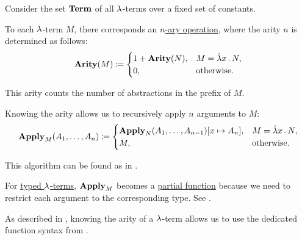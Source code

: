 \begin{algorithm}\label{alg:untyped_lambda_term_to_function}
  Consider the set \hyperref[def:lambda_term/term]{\( \op*{Term} \)} of all \( {\mathrm \lambda} \)-terms over a fixed set of constants.

  To each \( {\mathrm \lambda} \)-term \( M \), there corresponds an \hyperref[def:operation_on_set]{\( n \)-ary operation}, where the arity \( n \) is determined as follows:
  \begin{equation}\label{eq:alg:untyped_lambda_term_to_function/arity}
    \op*{Arity}(M) \coloneqq \begin{cases}
      1 + \op*{Arity}(N), &M = \qabs x N, \\
      0,                  &\T{otherwise.}
    \end{cases}
  \end{equation}

  This arity counts the number of abstractions in the prefix of \( M \).

  Knowing the arity allows us to recursively apply \( n \) arguments to \( M \):
  \begin{equation}\label{eq:alg:untyped_lambda_term_to_function/apply}
    \op*{Apply}_M(A_1, \ldots, A_n) \coloneqq \begin{cases}
      \op*{Apply}_N(A_1, \ldots, A_{n-1})[x \mapsto A_n], &M = \qabs x N, \\
      M,                                                   &\T{otherwise.}
    \end{cases}
  \end{equation}
\end{algorithm}
\begin{comments}
  \item This algorithm can be found as  in \cite{notebook:code}.

  \item For \hyperref[def:typed_lambda_term]{typed \( {\mathrm \lambda} \)-terms}, \( \op*{Apply}_M \) becomes a \hyperref[def:set_valued_map/partial]{partial function} because we need to restrict each argument to the corresponding type. See .

  \item As described in , knowing the arity of a \( {\mathrm \lambda} \)-term allows us to use the dedicated function syntax from .
\end{comments}

